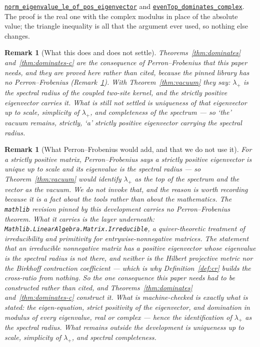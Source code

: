 \documentclass[11pt]{article}
\newtheorem{remark}[theorem]{Remark}
\theoremstyle{definition}
\newcommand{\anchor}{a70426f4c8a0ed733b4eee94fb01b158bc81fd08}
\newcommand{\osline}[3]{%
  \href{https://github.com/lluiseriksson/THE-ERIKSSON-PROGRAMME/blob/\anchor/YangMills/OS/#1.lean\#L#2}{\nolinkurl{#3}}}
\begin{document}
\osline{SpatialPerron}{472}{norm\_eigenvalue\_le\_of\_pos\_eigenvector} and
\osline{SpatialPerron}{518}{evenTop\_dominates\_complex}.  The proof is the real
one with the complex modulus in place of the absolute value; the triangle
inequality is all that the argument ever used, so nothing else changes.

\begin{remark}[What this does and does not settle]
Theorems~\ref{thm:dominates} and~\ref{thm:dominates-c} are the consequence of
Perron--Frobenius that this paper needs, and they are proved here rather than
cited, because the pinned library has no Perron--Frobenius
(Remark~\ref{rem:pf}).  With Theorem~\ref{thm:vacuum} they say: $\lambda_+$ is
the spectral radius of the coupled two-site kernel, and the strictly positive
eigenvector carries it.  What is still \emph{not} settled is uniqueness of that
eigenvector up to scale, simplicity of $\lambda_+$, and completeness of the
spectrum --- so `the' vacuum remains, strictly, `a' strictly positive
eigenvector carrying the spectral radius.
\end{remark}

\begin{remark}[What Perron--Frobenius would add, and that we do not use it]
\label{rem:pf}
For a strictly positive matrix, Perron--Frobenius says a strictly positive
eigenvector is unique up to scale and its eigenvalue is the spectral radius ---
so Theorem~\ref{thm:vacuum} would identify $\lambda_+$ as the top of the
spectrum and the vector as \emph{the} vacuum.  We do not invoke that, and the
reason is worth recording because it is a fact about the tools rather than about
the mathematics.  The \texttt{mathlib} revision pinned by this development
carries \emph{no} Perron--Frobenius theorem.  What it carries is the layer
underneath: \texttt{Mathlib.LinearAlgebra.Matrix.Irreducible}, a quiver-theoretic
treatment of irreducibility and primitivity for entrywise-nonnegative matrices.
The statement that an irreducible nonnegative matrix has a positive eigenvector
whose eigenvalue is the spectral radius is not there, and neither is the Hilbert
projective metric nor the Birkhoff contraction coefficient --- which is why
Definition~\ref{def:cr} builds the cross-ratio from nothing.  So the one
consequence this paper needs had to be constructed rather than cited, and
Theorems~\ref{thm:dominates} and~\ref{thm:dominates-c} construct it.  What is
machine-checked is exactly what is stated: the eigen-equation, strict positivity
of the eigenvector, and domination in modulus of every eigenvalue, real or
complex --- hence the identification of $\lambda_+$ as the spectral radius.
What remains outside the development is uniqueness up to scale, simplicity of
$\lambda_+$, and spectral completeness.
\end{remark}
\end{document}
